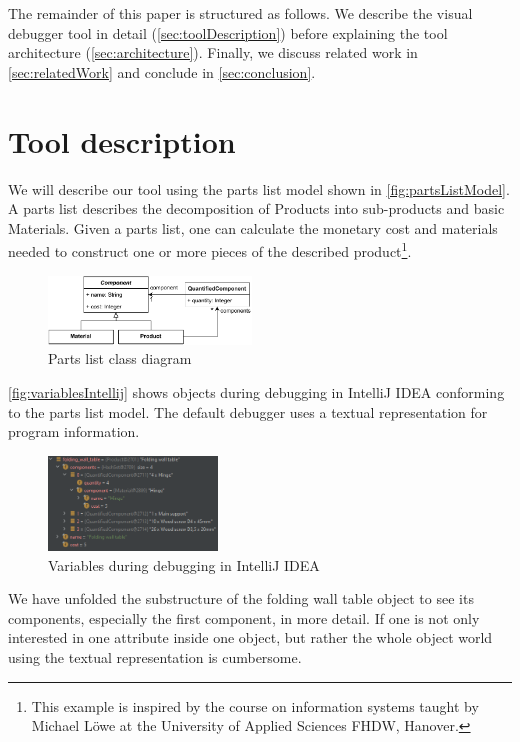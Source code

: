 \documentclass[conference]{IEEEtran}
\newcommand{\intellij}{IntelliJ IDEA}
\begin{document}
The remainder of this paper is structured as follows.
We describe the visual debugger tool in detail (\autoref{sec:toolDescription}) before explaining the tool architecture (\autoref{sec:architecture}).
Finally, we discuss related work in \autoref{sec:relatedWork} and conclude in \autoref{sec:conclusion}.

\section{Tool description} \label{sec:toolDescription}
We will describe our tool using the parts list model shown in \autoref{fig:partsListModel}.
A parts list describes the decomposition of \textsf{Products} into sub-products and basic \textsf{Materials}.
Given a parts list, one can calculate the monetary cost and materials needed to construct one or more pieces of the described product\footnote{This example is inspired by the course on information systems taught by Michael Löwe at the University of Applied Sciences FHDW, Hanover.}.

\begin{figure}[h]
    \centering
    \includegraphics[width=0.48\textwidth]{images/VD-partsList-classes.pdf}
    \caption{Parts list class diagram}
    \label{fig:partsListModel}
\end{figure}

\autoref{fig:variablesIntellij} shows objects during debugging in \intellij{} conforming to the parts list model. 
The default debugger uses a textual representation for program information.

\begin{figure}[h]
    \centering
    \includegraphics[width=0.4\textwidth]{images/variables.png}
    \caption{Variables during debugging in \intellij}
    \label{fig:variablesIntellij}
\end{figure}

We have unfolded the substructure of the \textsf{folding wall table} object to see its components, especially the first component, in more detail.
If one is not only interested in one attribute inside one object, but rather the whole object world using the textual representation is cumbersome.
\end{document}
